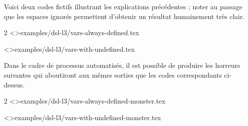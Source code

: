 \documentclass{tutodoc}
\begin{document}


Voici deux codes fictifs illustrant les explications précédentes ; noter au passage que les espaces ignorés permettent d'obtenir un résultat humainement très clair.
\begin{multicols}{2}
    \tdoclatexinput<>{examples/dsl-l3/vars-always-defined.tex}

    \tdoclatexinput<>{examples/dsl-l3/vars-with-undefined.tex}
\end{multicols}

Dans le cadre de processus automatisés, il est possible de produire les horreurs suivantes qui aboutiront aux mêmes sorties que les codes correspondants ci-dessus.
\begin{multicols}{2}
    \tdoclatexinput<>{examples/dsl-l3/vars-always-defined-monster.tex}

    \tdoclatexinput<>{examples/dsl-l3/vars-with-undefined-monster.tex}
\end{multicols}
\end{document}

